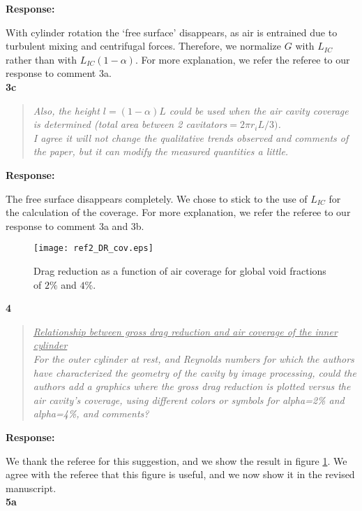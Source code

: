 \documentclass[10pt]{article}
\newcommand{\strong}[1]{\textbf{#1}}
\newcommand{\question}[1]{\begin{quote} \emph{#1}  \end{quote} }
\begin{document}
\noindent \strong{Response:} 

\noindent With cylinder rotation the `free surface' disappears, as air is entrained due to turbulent mixing and centrifugal forces. Therefore, we normalize $G$ with $L_{IC}$ rather than with $L_{IC}(1-\alpha)$. For more explanation, we refer the referee to our response to comment 3a. \\

\noindent \strong{3c}

\question{Also, the height $l=(1-\alpha)L$ could be used when the air cavity coverage is determined (total area between 2 cavitators$=2\pi r_i L/3)$.\\
 I agree it will not change the qualitative trends observed and comments of the paper, but it can modify the measured quantities a little.
 }

\noindent \strong{Response:} 

\noindent The free surface disappears completely. We chose to stick to the use of $L_{IC}$ for the calculation of the coverage. For more explanation, we refer the referee to our response to comment 3a and 3b. \\


\begin{figure}[htp]
\begin{center}
\texttt{[image: ref2\_DR\_cov.eps]}
\caption{Drag reduction as a function of air coverage for global void fractions of $2\%$ and $4\%$.} 
\label{DR_cov}
\end{center}
\end{figure} 

\noindent \strong{4}

\question{\underline{Relationship between gross drag  reduction and air coverage of the inner cylinder} \\
For the outer cylinder at rest, and Reynolds numbers for which the authors have characterized the geometry of the cavity by image processing, could the authors add a graphics where the gross drag reduction is plotted versus the air cavity's coverage, using different colors or symbols for alpha=2\% and alpha=4\%, and comments? }

\noindent \strong{Response:} 

\noindent We thank the referee for this suggestion, and we show the result in figure \ref{DR_cov}. We agree with the referee that this figure is useful, and we now show it in the revised manuscript.\\

\noindent \strong{5a}
\end{document}
